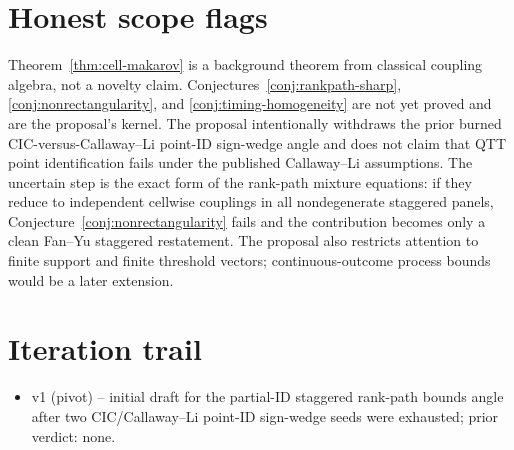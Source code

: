\documentclass[11pt]{article}
\theoremstyle{definition}
\theoremstyle{plain}
\theoremstyle{remark}
\begin{document}
\section{Honest scope flags}
Theorem~\ref{thm:cell-makarov} is a background theorem from classical coupling algebra, not a novelty claim.  Conjectures~\ref{conj:rankpath-sharp}, \ref{conj:nonrectangularity}, and \ref{conj:timing-homogeneity} are not yet proved and are the proposal's kernel.  The proposal intentionally withdraws the prior burned CIC-versus-Callaway--Li point-ID sign-wedge angle and does not claim that QTT point identification fails under the published Callaway--Li assumptions.  The uncertain step is the exact form of the rank-path mixture equations: if they reduce to independent cellwise couplings in all nondegenerate staggered panels, Conjecture~\ref{conj:nonrectangularity} fails and the contribution becomes only a clean Fan--Yu staggered restatement.  The proposal also restricts attention to finite support and finite threshold vectors; continuous-outcome process bounds would be a later extension.

\section{Iteration trail}
\begin{itemize}[leftmargin=*]
\item v1 (pivot) -- initial draft for the partial-ID staggered rank-path bounds angle after two CIC/Callaway--Li point-ID sign-wedge seeds were exhausted; prior verdict: none.
\end{itemize}
\end{document}
